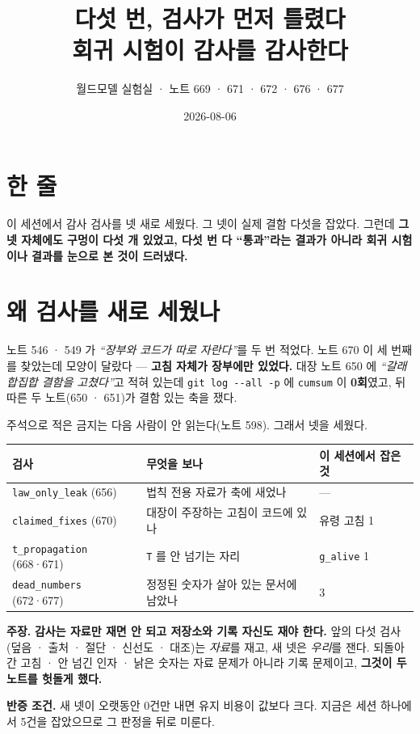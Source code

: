 \documentclass[10pt,a4paper]{article}
\title{\bfseries 다섯 번, 검사가 먼저 틀렸다\\[2pt]
\large 회귀 시험이 감사를 감사한다}
\author{월드모델 실험실 · 노트 669 · 671 · 672 · 676 · 677}
\date{2026-08-06}
\newcommand{\claim}[2]{\begin{claimbox}\textbf{주장.} #1\par\smallskip
  \textcolor{gray!70}{\textbf{반증 조건.} #2}\end{claimbox}}
\begin{document}
\maketitle

\section{한 줄}

이 세션에서 감사 검사를 넷 새로 세웠다. 그 넷이 실제 결함 다섯을 잡았다. 그런데
\textbf{그 넷 자체에도 구멍이 다섯 개 있었고, 다섯 번 다 ``통과''라는 결과가 아니라
회귀 시험이나 결과를 눈으로 본 것이 드러냈다.}

\section{왜 검사를 새로 세웠나}

노트 546 · 549 가 \emph{``장부와 코드가 따로 자란다''}를 두 번 적었다. 노트 670 이 세
번째를 찾았는데 모양이 달랐다 --- \textbf{고침 자체가 장부에만 있었다.} 대장 노트 650 에
\emph{``갈래 합집합 결함을 고쳤다''}고 적혀 있는데 \verb|git log --all -p| 에
\verb|cumsum| 이 \textbf{0회}였고, 뒤따른 두 노트(650 · 651)가 결함 있는 축을 쟀다.

주석으로 적은 금지는 다음 사람이 안 읽는다(노트 598). 그래서 넷을 세웠다.

\begin{center}
\begin{tabular}{lll}
\toprule
검사 & 무엇을 보나 & 이 세션에서 잡은 것 \\
\midrule
\verb|law_only_leak| (656) & 법칙 전용 자료가 축에 새었나 & --- \\
\verb|claimed_fixes| (670) & 대장이 주장하는 고침이 코드에 있나 & 유령 고침 1 \\
\verb|t_propagation| (668·671) & \texttt{T} 를 안 넘기는 자리 & \verb|g_alive| 1 \\
\verb|dead_numbers| (672·677) & 정정된 숫자가 살아 있는 문서에 남았나 & 3 \\
\bottomrule
\end{tabular}
\end{center}

\claim{\textbf{감사는 자료만 재면 안 되고 저장소와 기록 자신도 재야 한다.} 앞의 다섯
검사(덮음 · 출처 · 절단 · 신선도 · 대조)는 \emph{자료}를 재고, 새 넷은 \emph{우리}를
잰다. 되돌아간 고침 · 안 넘긴 인자 · 낡은 숫자는 자료 문제가 아니라 기록 문제이고,
\textbf{그것이 두 노트를 헛돌게 했다.}}
{새 넷이 오랫동안 0건만 내면 유지 비용이 값보다 크다. 지금은 세션 하나에서 5건을
잡았으므로 그 판정을 뒤로 미룬다.}
\end{document}
